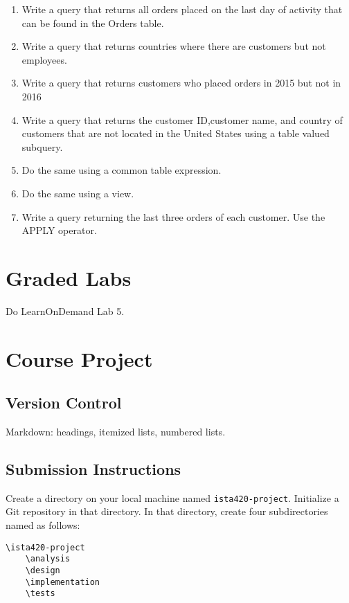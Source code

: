 \documentclass{article}
\begin{document}
    \begin{enumerate}
        \item Write a query that returns all orders placed on the last day of activity that can be found in the Orders table.
        \item Write a query that returns countries where there are customers but not employees. 
        \item Write a query that returns customers who placed orders in 2015 but not in 2016 
        \item Write a query that returns the customer ID,customer name, and country of customers that are not located in the United States using a table valued subquery. 
        \item Do the same using a common table expression.
        \item Do the same using a view.
        \item Write a query returning the last three orders of each customer. Use the APPLY operator.
    \end{enumerate}


    \section{Graded Labs}

    Do LearnOnDemand Lab 5.

    \section{Course Project}

        \subsection{Version Control}

        Markdown: headings, itemized lists, numbered lists.

        \subsection{Submission Instructions}

        Create a directory on your local machine named \texttt{ista420-project}. Initialize a Git repository in that directory. In that directory, create four subdirectories named as follows:

        \begin{verbatim}
\ista420-project
    \analysis
    \design
    \implementation
    \tests
        \end{verbatim}
\end{document}
